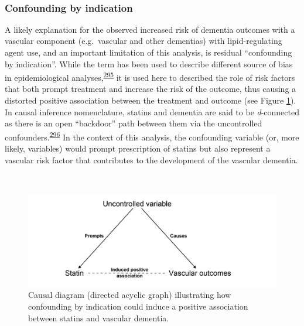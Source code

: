 \documentclass[a4paper, twoside]{templates/ociamthesis}
\begin{document}
~

\hypertarget{confounding-by-indication}{%
\subsubsection{Confounding by indication}\label{confounding-by-indication}}

A likely explanation for the observed increased risk of dementia outcomes with a vascular component (e.g.~vascular and other dementias) with lipid-regulating agent use, and an important limitation of this analysis, is residual ``confounding by indication''. While the term has been used to describe different source of bias in epidemiological analyses,\textsuperscript{\protect\hyperlink{ref-salas1999}{295}} it is used here to described the role of risk factors that both prompt treatment and increase the risk of the outcome, thus causing a distorted positive association between the treatment and outcome (see Figure \ref{fig:indicationBias}). In causal inference nomenclature, statins and dementia are said to be \emph{d}-connected as there is an open ``backdoor'' path between them via the uncontrolled confounders.\textsuperscript{\protect\hyperlink{ref-suttorp2015}{296}} In the context of this analysis, the confounding variable (or, more likely, variables) would prompt prescription of statins but also represent a vascular risk factor that contributes to the development of the vascular dementia.

~\\




\begin{figure}[H]

{\centering \includegraphics[width=0.8\linewidth]{figures/cprd-analysis/indicationBias} 

}

\caption[Confounding by indication causal diagram]{Causal diagram (directed acyclic graph) illustrating how confounding by indication could induce a positive association between statins and vascular dementia.}\label{fig:indicationBias}
\end{figure}
\end{document}
